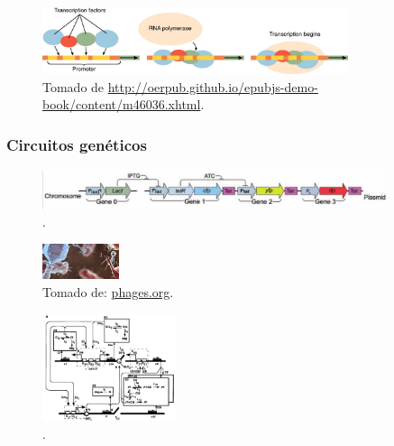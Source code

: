 \documentclass{beamer}
\begin{document}
\begin{frame}
\begin{columns}[c]
\end{columns}

\begin{figure}[p]
    \centering
    \includegraphics[width=0.8\textwidth]{tf1.jpg}\\
    \tiny Tomado de \url{http://oerpub.github.io/epubjs-demo-book/content/m46036.xhtml}.
\end{figure}
\end{frame}

\begin{frame}
\frametitle{Circuitos gen\'eticos}

\begin{figure}[p]
    \centering
    \includegraphics[width=0.9\textwidth]{circuitex.png}\\
    \tiny \cite{pedraza05}.
\end{figure}

\begin{figure}[p]
    \centering
    \includegraphics[width=0.2\textwidth]{phageim.jpg}\\
    \tiny Tomado de: \url{phages.org}.
\end{figure}

\begin{figure}[p]
    \centering
    \includegraphics[width=0.35\textwidth]{lambdacirc.png}\\
    \tiny \cite{arkin98}.
\end{figure}

\end{frame}
\end{document}
